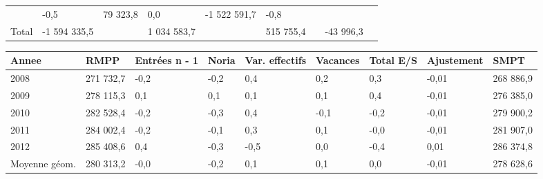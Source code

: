 \begin{longtable}[]{@{}lllllllll@{}}
\begin{minipage}[t]{0.16\columnwidth}
\end{minipage} & \begin{minipage}[t]{0.06\columnwidth}\raggedright
-0,5\strut
\end{minipage} & \begin{minipage}[t]{0.12\columnwidth}\raggedright
79 323,8\strut
\end{minipage} & \begin{minipage}[t]{0.06\columnwidth}\raggedright
0,0\strut
\end{minipage} & \begin{minipage}[t]{0.10\columnwidth}\raggedright
-1 522 591,7\strut
\end{minipage} & \begin{minipage}[t]{0.06\columnwidth}\raggedright
-0,8\strut
\end{minipage}\tabularnewline
\begin{minipage}[t]{0.05\columnwidth}\raggedright
Total\strut
\end{minipage} & \begin{minipage}[t]{0.10\columnwidth}\raggedright
-1 594 335,5\strut
\end{minipage} & \begin{minipage}[t]{0.06\columnwidth}\raggedright
\strut
\end{minipage} & \begin{minipage}[t]{0.16\columnwidth}\raggedright
1 034 583,7\strut
\end{minipage} & \begin{minipage}[t]{0.06\columnwidth}\raggedright
\strut
\end{minipage} & \begin{minipage}[t]{0.12\columnwidth}\raggedright
515 755,4\strut
\end{minipage} & \begin{minipage}[t]{0.06\columnwidth}\raggedright
\strut
\end{minipage} & \begin{minipage}[t]{0.10\columnwidth}\raggedright
-43 996,3\strut
\end{minipage} & \begin{minipage}[t]{0.06\columnwidth}\raggedright
\strut
\end{minipage}\tabularnewline
\bottomrule
\end{longtable}

\begin{longtable}[]{@{}lllllllll@{}}
\toprule
Annee & RMPP & Entrées n - 1 & Noria & Var. effectifs & Vacances & Total
E/S & Ajustement & SMPT\tabularnewline
\midrule
\endhead
2008 & 271 732,7 & -0,2 & -0,2 & 0,4 & 0,2 & 0,3 & -0,01 & 268
886,9\tabularnewline
2009 & 278 115,3 & 0,1 & 0,1 & 0,1 & 0,1 & 0,4 & -0,01 & 276
385,0\tabularnewline
2010 & 282 528,4 & -0,2 & -0,3 & 0,4 & -0,1 & -0,2 & -0,01 & 279
900,2\tabularnewline
2011 & 284 002,4 & -0,2 & -0,1 & 0,3 & 0,1 & -0,0 & -0,01 & 281
907,0\tabularnewline
2012 & 285 408,6 & 0,4 & -0,3 & -0,5 & 0,0 & -0,4 & 0,01 & 286
374,8\tabularnewline
Moyenne géom. & 280 313,2 & -0,0 & -0,2 & 0,1 & 0,1 & 0,0 & -0,01 & 278
628,6\tabularnewline
\bottomrule
\end{longtable}


